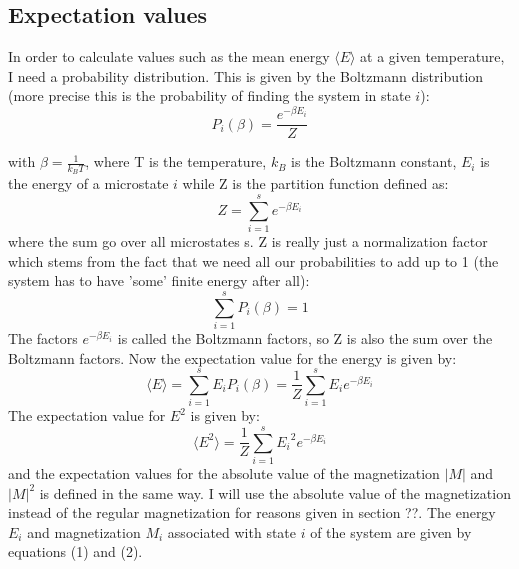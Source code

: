 \documentclass[twocolumn]{article}
\begin{document}
\subsection{Expectation values}
In order to calculate values such as the mean energy $\langle E \rangle$ at a given temperature, I need a probability distribution. This is given by the Boltzmann distribution (more precise this is the probability of finding the system in state $i$):
\begin{equation}
    P_i (\beta) = \frac{e^{-\beta E_i}}{Z}
\end{equation}

with $\beta = \frac{1}{k_B T}$, where T is the temperature, $k_B$ is the Boltzmann constant, $E_i$ is the energy of a microstate $i$ while Z is the partition function defined as:
\begin{equation}
    Z = \sum_{i=1}^{s}e^{-\beta E_i}
\end{equation}
where the sum go over all microstates s. Z is really just a normalization factor which stems from the fact that we need all our probabilities to add up to 1 (the system has to have 'some' finite energy after all):
$$\sum_{i=1}^{s}P_i(\beta) = 1$$
The factors $e^{-\beta E_i}$ is called the Boltzmann factors, so Z is also the sum over the Boltzmann factors.\newline
Now the expectation value for the energy is given by:
\begin{equation}
    \langle E \rangle = \sum_{i=1}^{s}E_i P_i(\beta) = \frac{1}{Z}\sum_{i=1}^{s}E_i e^{-\beta E_i}
\end{equation}
The expectation value for $E^2$ is given by:
\begin{equation}
    \langle E^2 \rangle = \frac{1}{Z}\sum_{i=1}^{s}{E_i}^2 e^{-\beta E_i}
\end{equation}
and the expectation values for the absolute value of the magnetization $|M|$ and $|M|^2$ is defined in the same way. I will use the absolute value of the magnetization instead of the regular magnetization for reasons given in section ??.\newline
The energy $E_i$ and magnetization $M_i$ associated with state $i$ of the system are given by equations (1) and (2).\newline
\end{document}
